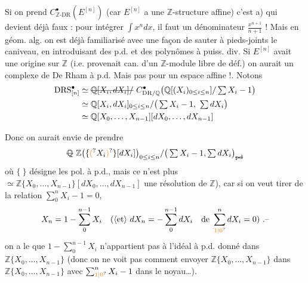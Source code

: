 Si on prend $C_{\mathbb Z\text{-}\mathrm{DR}}^{\bullet}(E^{[n]})$ (car $E^{[n]}$ a une $\mathbb Z$-structure affine) c'est a) qui devient déjà faux : pour intégrer $\int x^n dx$, il faut un dénominateur  $\frac{x^{n+1}}{n+1}$ ! Mais en géom. alg. on est déjà familiarisé avec une façon de sauter à pieds-joints  le caniveau, en introduisant des p.d. et des polynômes  à puiss. div. Si $E^{[n]}$ avait une origine sur $\mathbb Z$ (i.e. provenait can. d'un $\mathbb Z$-module libre de déf.) on aurait un complexe de De Rham à p.d. Mais pas pour un espace affine !. Notons
\[
\begin{aligned}
\mathrm{DRS}^{\bullet}_{[n]}&\simeq\deleted{\mathbb Q[X_i,dX_i]/}\ C^\bullet_{\mathrm{DR}/\mathbb Q}\big(\mathbb Q[(X_i)_{0\leq i\leq n}]/\textstyle\sum X_i-1\big)\\
&\simeq\mathbb Q[X_i,dX_i]_{0\leq i\leq n}/\big(\textstyle\sum X_i-1,\ \textstyle\sum dX_i\big)\\
&\simeq\mathbb Q[X_0,\ldots,X_{n-1}][dX_0,\ldots,dX_{n-1}]
\end{aligned}
\]

Donc on aurait envie de prendre
\[
\deleted{\mathbb Q}\ \mathbb Z\big(\{\unsure{(}X_i\unsure{)}\}[dX_i]\big)_{0\leq i\leq n}/\big(\textstyle\sum X_i-1,\sum dX_i\big)_{\deleted{\mathrm{pd}}}
\]
où $\{\ \}$ désigne les pol. à p.d., mais ce n'est plus $\simeq\mathbb Z\{X_0,\ldots,X_{n-1}\}[dX_0,\ldots,dX_{n-1}]$   une résolution de $\mathbb Z$), car si on veut tirer de la relation $\sum_0^n X_i-1=0$,
\[
X_n=1-\sum_0^{n-1}X_i\quad(\inserted{\text{et}}\ dX_n=-\sum_0^{n-1}dX_i\quad\text{de }\sum_{\unsure{1|0}}^n dX_i=0)\ .\text{--}
\]
on a le  que $1-\sum_0^{n-1}X_i$ n'appartient pas à l'idéal à p.d. donné dans $\mathbb Z\{X_0,\ldots,X_{n-1}\}$ (donc on ne voit pas comment envoyer $\mathbb Z\{X_0,\ldots,X_{n-1}\}$ dans $\mathbb Z\{X_0,\ldots,X_{n-1}\}$ avec   $\sum_{\unsure{1|0}}^n X_i-1$ dans le noyau\ldots).

